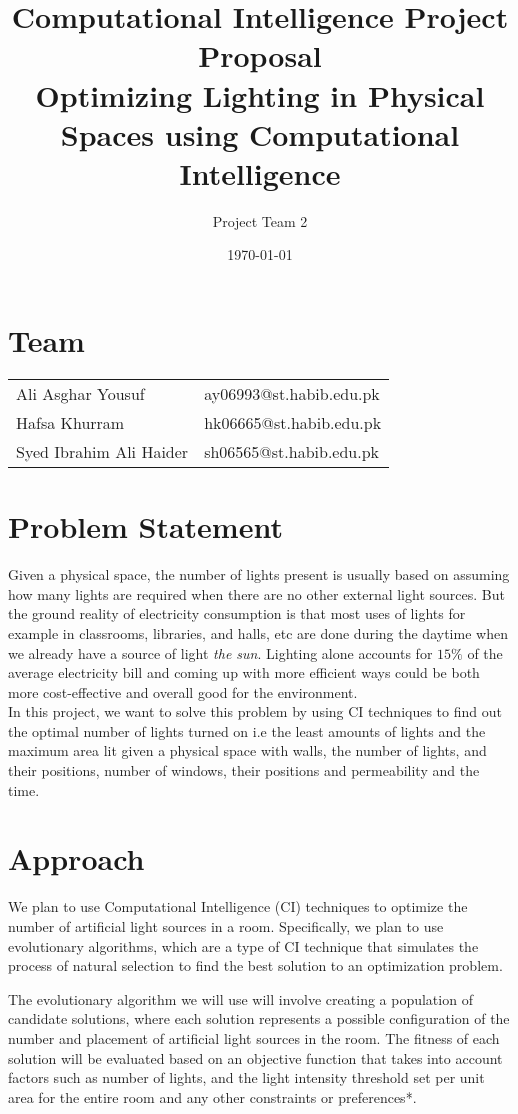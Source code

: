 \documentclass{article}
\title{Computational Intelligence Project Proposal\\
      \large Optimizing Lighting in Physical \\ Spaces using Computational Intelligence}
\author{Project Team 2}
\date{\today}
\begin{document}
\maketitle
\section*{Team}
\begin{tabular}{ l l }
    Ali Asghar Yousuf & ay06993@st.habib.edu.pk \\ 
    Hafsa Khurram & hk06665@st.habib.edu.pk \\
    Syed Ibrahim Ali Haider & sh06565@st.habib.edu.pk 
\end{tabular}
   
\section{Problem Statement}


Given a physical space, the number of lights present is usually based on assuming how many lights are required when there are no other external light sources. But the ground reality of electricity consumption is that most uses of lights for example in classrooms, libraries, and halls, etc are done during the daytime when we already have a source of light \textit{the sun}. Lighting alone accounts for \(15\%\) of the average electricity bill \cite{energy.gov} and coming up with more efficient ways could be both more cost-effective and overall good for the environment.
\\
In this project, we want to solve this problem by using CI techniques to find out the optimal number of lights turned on i.e the least amounts of lights and the maximum area lit given a physical space with walls, the number of lights, and their positions, number of windows, their positions and permeability and the time. 

\section{Approach}

We plan to use Computational Intelligence (CI) techniques to optimize the number of artificial light sources in a room. Specifically, we plan to use evolutionary algorithms, which are a type of CI technique that simulates the process of natural selection to find the best solution to an optimization problem.

The evolutionary algorithm we will use will involve creating a population of candidate solutions, where each solution represents a possible configuration of the number and placement of artificial light sources in the room. The fitness of each solution will be evaluated based on an objective function that takes into account factors such as number of lights, and the light intensity threshold set per unit area for the entire room and any other constraints or preferences*.
\end{document}
